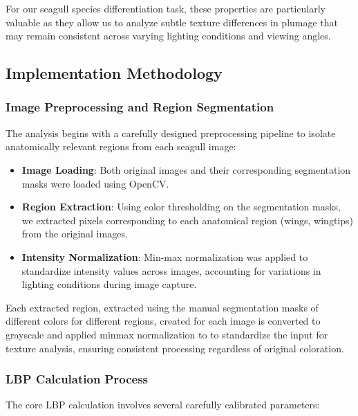 \documentclass[a4paper,12pt]{report}
\begin{document}
For our seagull species differentiation task, these properties are particularly valuable as they allow us to analyze subtle texture differences in plumage that may remain consistent across varying lighting conditions and viewing angles.

\subsection{Implementation Methodology}

\subsubsection{Image Preprocessing and Region Segmentation}

The analysis begins with a carefully designed preprocessing pipeline to isolate anatomically relevant regions from each seagull image:

\begin{itemize}
\item \textbf{Image Loading}: Both original images and their corresponding segmentation masks were loaded using OpenCV.
    
\item \textbf{Region Extraction}: Using color thresholding on the segmentation masks, we extracted pixels corresponding to each anatomical region (wings, wingtips) from the original images.

\item \textbf{Intensity Normalization}: Min-max normalization was applied to standardize intensity values across images, accounting for variations in lighting conditions during image capture.

\end{itemize}

Each extracted region, extracted using the manual segmentation masks of different colors for different regions, created for each image is converted to grayscale and applied minmax normalization to to standardize the input for texture analysis, ensuring consistent processing regardless of original coloration.

\subsubsection{LBP Calculation Process}

The core LBP calculation involves several carefully calibrated parameters:
\end{document}
